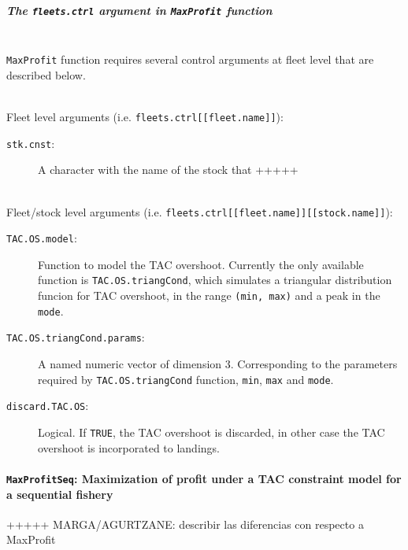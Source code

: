\subparagraph{The \texttt{fleets.ctrl} argument in \texttt{MaxProfit} function}
\quad\\

  \texttt{MaxProfit} function requires several control arguments at fleet level
    that are described below.

  \quad\\
  \noindent Fleet level arguments (i.e. \texttt{fleets.ctrl[[fleet.name]]}):
  \begin{description}
    \item[\texttt{stk.cnst}:] A character with the name of the stock that +++++
  \end{description}

  \quad\\
  \noindent Fleet/stock level arguments (i.e. \texttt{fleets.ctrl[[fleet.name]][[stock.name]]}):
  \begin{description}
    \item[\texttt{TAC.OS.model}:] Function to model the TAC overshoot. 
      Currently the only available function is \texttt{TAC.OS.triangCond}, which simulates a triangular distribution funcion 
      for TAC overshoot, in the range \texttt{(min, max)} and a peak in the \texttt{mode}.
    \item[\texttt{TAC.OS.triangCond.params}:] A named numeric vector of dimension 3. Corresponding to the parameters required by \texttt{TAC.OS.triangCond} function, \texttt{min}, \texttt{max} and \texttt{mode}.
    \item[\texttt{discard.TAC.OS}:] Logical. If \texttt{TRUE}, the TAC overshoot is discarded, in other case the TAC overshoot
      is incorporated to landings.
  \end{description}


\paragraph{\texttt{MaxProfitSeq}: Maximization of profit under a TAC constraint model for a sequential fishery} \hspace{0pt} \smallskip

+++++ MARGA/AGURTZANE: describir las diferencias con respecto a MaxProfit


